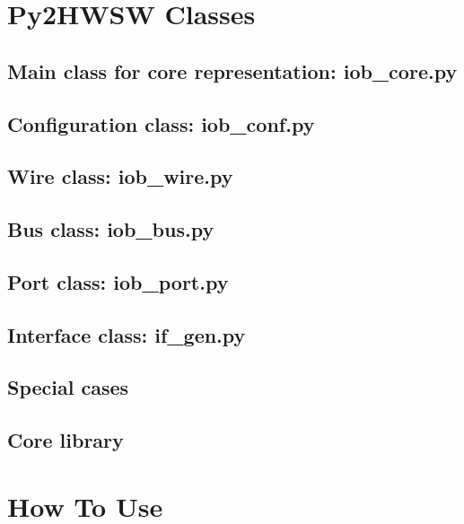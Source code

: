 \documentclass{ug}
\begin{document}
\section{Py2HWSW Classes}
\label{sec:py_classes}

\subsection{Main class for core representation: iob\_core.py}
\label{sec:iob_core}


\subsection{Configuration class: iob\_conf.py}
\label{sec:iob_conf}


\subsection{Wire class: iob\_wire.py}
\label{sec:iob_wire}


\subsection{Bus class: iob\_bus.py}
\label{sec:iob_bus}


\subsection{Port class: iob\_port.py}
\label{sec:iob_port}


\subsection{Interface class: if\_gen.py}
\label{sec:if_gen}


\subsection{Special cases}
\label{sec:special_cases}


\subsection{Core library}
\label{sec:core_lib}


%
%
\ifdefined\SECTIONCLEARPAGE
\clearpage
\fi
\section{How To Use}
\label{sec:usage}
\end{document}
